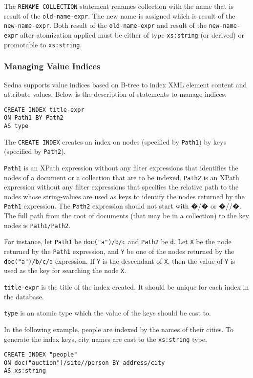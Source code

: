 \documentclass[a4paper,12pt]{article}
\begin{document}
The \verb!RENAME COLLECTION! statement renames collection with the name that is result of the \verb!old-name-expr!.
The new name is assigned which is result of the \verb!new-name-expr!.
Both result of the \verb!old-name-expr! and result of the \verb!new-name-expr! after atomization applied must be either
of type \verb!xs:string! (or derived) or promotable to \verb!xs:string!.

\subsubsection{Managing Value Indices}
\label{sec:managing-value-indices}
Sedna supports value indices based on B-tree to index XML element content and attribute values. Below is the description of statements to manage indices.

\begin{verbatim}
CREATE INDEX title-expr
ON Path1 BY Path2
AS type
\end{verbatim}

The \verb!CREATE INDEX! creates an index on nodes (specified by \verb!Path1!) by keys (specified by \verb!Path2!).

\verb!Path1! is an XPath expression without any filter expressions that identifies the nodes of a document or a collection that are to be indexed. \verb!Path2! is an XPath expression without any filter expressions that specifies the relative path to the nodes  whose string-values are used as keys to identify the nodes returned by the \verb!Path1! expression. The \verb!Path2! expression should not start with �/� or �//�. The full path from the root of documents (that may be in a collection) to the key nodes is \verb!Path1/Path2!.

For instance, let \verb!Path1! be \verb!doc("a")/b/c! and \verb!Path2! be \verb!d!. Let \verb!X! be  the node returned by the \verb!Path1! expression, and \verb!Y! be one of the nodes returned by the \verb!doc("a")/b/c/d! expression. If \verb!Y! is the descendant of \verb!X!, then the value of \verb!Y! is used as the key for searching the node \verb!X!.

\verb!title-expr! is the title of the index created. It should be unique for each index in the database.

\verb!type! is an atomic type which the value of the keys should be cast to.

In the following example, people are indexed by the names of their cities. To generate the index keys, city names are cast to the \verb!xs:string! type.
\begin{verbatim}
CREATE INDEX "people"
ON doc("auction")/site//person BY address/city
AS xs:string
\end{verbatim}
\end{document}
